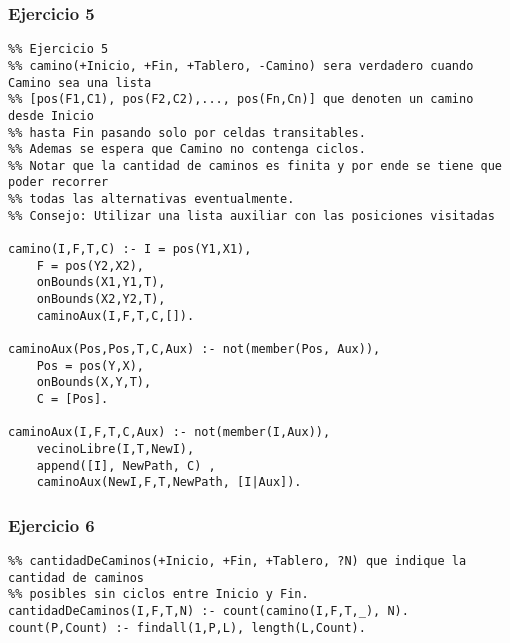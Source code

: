 \subsubsection*{Ejercicio 5}
\begin{lstlisting}
%% Ejercicio 5
%% camino(+Inicio, +Fin, +Tablero, -Camino) sera verdadero cuando Camino sea una lista
%% [pos(F1,C1), pos(F2,C2),..., pos(Fn,Cn)] que denoten un camino desde Inicio
%% hasta Fin pasando solo por celdas transitables.
%% Ademas se espera que Camino no contenga ciclos.
%% Notar que la cantidad de caminos es finita y por ende se tiene que poder recorrer
%% todas las alternativas eventualmente.
%% Consejo: Utilizar una lista auxiliar con las posiciones visitadas

camino(I,F,T,C) :- I = pos(Y1,X1),
	F = pos(Y2,X2),
	onBounds(X1,Y1,T),
	onBounds(X2,Y2,T),
	caminoAux(I,F,T,C,[]).

caminoAux(Pos,Pos,T,C,Aux) :- not(member(Pos, Aux)),
	Pos = pos(Y,X),
	onBounds(X,Y,T),
	C = [Pos].

caminoAux(I,F,T,C,Aux) :- not(member(I,Aux)),
	vecinoLibre(I,T,NewI),
	append([I], NewPath, C) ,
	caminoAux(NewI,F,T,NewPath, [I|Aux]).

\end{lstlisting}
\vspace{1cm}

\subsubsection*{Ejercicio 6}
\begin{lstlisting}
%% cantidadDeCaminos(+Inicio, +Fin, +Tablero, ?N) que indique la cantidad de caminos
%% posibles sin ciclos entre Inicio y Fin.
cantidadDeCaminos(I,F,T,N) :- count(camino(I,F,T,_), N).
count(P,Count) :- findall(1,P,L), length(L,Count).

\end{lstlisting}
\vspace{1cm}

